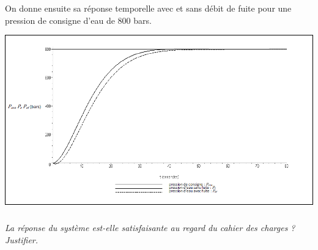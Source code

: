 \documentclass[10pt,fleqn]{article} %
\begin{document}
On donne ensuite sa réponse temporelle avec et sans débit de fuite pour une pression de consigne d’eau de 800 bars.


\begin{center}
\includegraphics[width=.8\linewidth]{images_02/fig_09}
\end{center}

\subparagraph{}
\textit{La réponse du système est-elle satisfaisante au regard du cahier des charges ? Justifier.}
\end{document}
